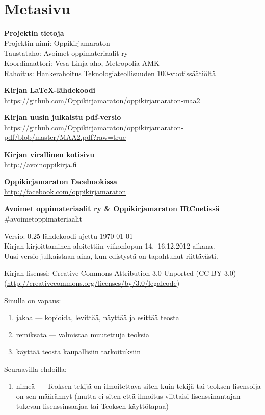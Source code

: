 \newpage
\section*{Metasivu}

\textbf{Projektin tietoja} \\
Projektin nimi: Oppikirjamaraton \\
Taustataho: Avoimet oppimateriaalit ry \\
Koordinaattori: Vesa Linja-aho, Metropolia AMK \\
Rahoitus: Hankerahoitus Teknologiateollisuuden 100-vuotissäätiöltä

\textbf{Kirjan LaTeX-lähdekoodi} \\
\url{https://github.com/Oppikirjamaraton/oppikirjamaraton-maa2}

\textbf{Kirjan uusin julkaistu pdf-versio} \\
\url{https://github.com/Oppikirjamaraton/oppikirjamaraton-pdf/blob/master/MAA2.pdf?raw=true}

\textbf{Kirjan virallinen kotisivu} \\
\url{http://avoinoppikirja.fi}

\textbf{Oppikirjamaraton Facebookissa} \\
\url{http://facebook.com/oppikirjamaraton}

\textbf{Avoimet oppimateriaalit ry \& Oppikirjamaraton IRCnetissä} \\
\#avoimetoppimateriaalit

Versio: 0.25 \qquad lähdekoodi ajettu \today \\
Kirjan kirjoittaminen aloitettiin viikonlopun 14.--16.12.2012 aikana. \\
Uusi versio julkaistaan aina, kun edistystä on tapahtunut riittävästi.

Kirjan lisenssi: Creative Commons Attribution 3.0 Unported (CC BY 3.0) \\
(\url{http://creativecommons.org/licenses/by/3.0/legalcode})

Sinulla on vapaus:
\begin{enumerate}
\item jakaa — kopioida, levittää, näyttää ja esittää teosta
\item remiksata — valmistaa muutettuja teoksia
\item käyttää teosta kaupallisiin tarkoituksiin
\end{enumerate}
Seuraavilla ehdoilla:
\begin{enumerate}
\item nimeä — Teoksen tekijä on ilmoitettava siten kuin tekijä tai teoksen lisensoija on sen määrännyt (mutta ei siten että ilmoitus viittaisi lisenssinantajan tukevan lisenssinsaajaa tai Teoksen käyttötapaa)
\end{enumerate}

